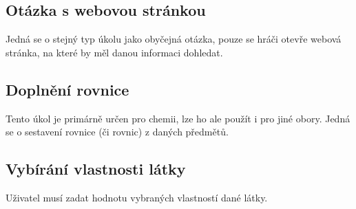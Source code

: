 \documentclass[a4paper,12pt]{article}
\begin{document}
\subsection{Otázka s webovou stránkou}
Jedná se o stejný typ úkolu jako obyčejná otázka, pouze se hráči otevře webová stránka, na které by měl danou informaci dohledat.
\subsection{Doplnění rovnice}
Tento úkol je primárně určen pro chemii, lze ho ale použít i pro jiné obory. Jedná se o sestavení rovnice (či rovnic) z daných předmětů.
\begin{figure}[H]
\end{figure}
\subsection{Vybírání vlastnosti látky}
Uživatel musí zadat hodnotu vybraných vlastností dané látky.
\begin{figure}[H]
\end{figure}
\end{document}
